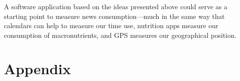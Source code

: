 \documentclass{article}
\begin{document}
	A software application based on the ideas presented above could serve as a starting point to measure news consumption---much in the same way that calendars can help to measure our time use, nutrition apps measure our consumption of macronutrients, and GPS measures our geographical position. 
	
	\newpage
	
	
	
	
	
	\newpage
	
	
	\section{Appendix}
	
	\begin{center}
		
		
		
		
		
		
		
	\end{center}
	
\end{document}
